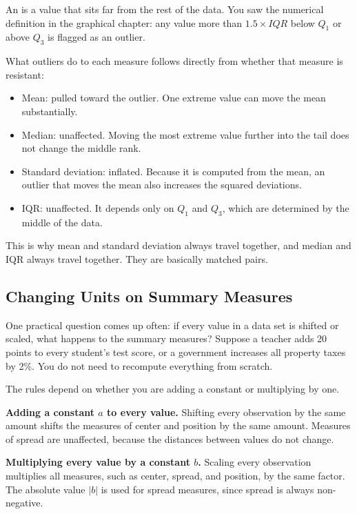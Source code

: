 An  is a value that sits far from the
rest of the data. You saw the numerical definition in the graphical
chapter: any value more than $1.5 \times IQR$ below $Q_1$ or above
$Q_3$ is flagged as an outlier.

What outliers do to each measure follows directly from whether that
measure is resistant:

\begin{itemize}
    \item Mean: pulled toward the outlier. One extreme value can move
    the mean substantially.
    \item Median: unaffected. Moving the most extreme value further
    into the tail does not change the middle rank.
    \item Standard deviation: inflated. Because it is computed from
    the mean, an outlier that moves the mean also increases the
    squared deviations.
    \item IQR: unaffected. It depends only on $Q_1$ and $Q_3$, which
    are determined by the middle of the data.
\end{itemize}

This is why mean and standard deviation always travel together, and
median and IQR always travel together. They are basically matched pairs.

\subsection{Changing Units on Summary Measures}

One practical question comes up often: if every value in a data set
is shifted or scaled, what happens to the summary measures? Suppose a
teacher adds 20 points to every student's test score, or a government
increases all property taxes by 2\%. You do not need to recompute
everything from scratch.

The rules depend on whether you are adding a constant or multiplying
by one.

\textbf{Adding a constant $a$ to every value.} Shifting every
observation by the same amount shifts the measures of center and
position by the same amount. Measures of spread are unaffected,
because the distances between values do not change.

\textbf{Multiplying every value by a constant $b$.} Scaling every
observation multiplies all measures, such as center, spread, and position, by the same factor. The absolute value $|b|$ is used for
spread measures, since spread is always non-negative.

